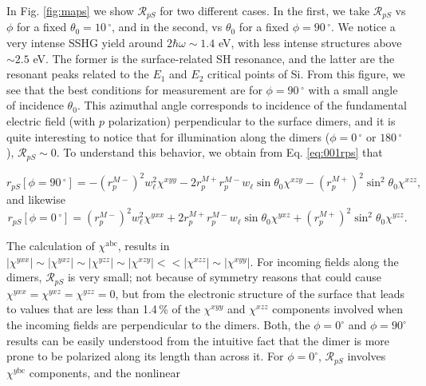 \documentclass[aps,prb,10pt,showpacs,letterpaper,twocolumn]{revtex4-1}
\begin{document}
In Fig. \ref{fig:maps} we show $\mathcal{R}_{pS}$ for two different cases. In
the first, we take $\mathcal{R}_{pS}$ vs $\phi$ for a fixed $\theta_{0} =
10\,^{\circ}$, and in the second, vs $\theta_{0}$ for a fixed $\phi =
90\,^{\circ}$. We notice a very intense SSHG yield around $2\hbar\omega\sim 1.4$
eV, with less intense structures above $\sim 2.5$ eV. The former is the
surface-related SH resonance, and the latter are the resonant peaks related to
the $E_{1}$ and $E_{2}$ critical points of Si. From this figure, we see that the
best conditions for measurement are for $\phi = 90\,^{\circ}$ with a small angle
of incidence $\theta_{0}$. This azimuthal angle corresponds to incidence of the
fundamental electric field (with $p$ polarization) perpendicular to the surface
dimers, and it is quite interesting to notice that for illumination along the
dimers ($\phi = 0\,^{\circ}$ or $180\,^{\circ}$), $\mathcal{R}_{pS}\sim 0$. To
understand this behavior, we obtain from Eq. \eqref{eq:001rps} that
\begin{widetext}
\begin{equation}\label{eq:001rps90}
r_{pS}[\phi=90\,^{\circ}] =
- \left(r^{M-}_{p}\right)^{2}w^{2}_{\ell}\chi^{xyy}
- 2r^{M+}_{p}r^{M-}_{p}w_{\ell}\sin\theta_{0}\chi^{xzy}
- \left(r^{M+}_{p}\right)^{2}\sin^{2}\theta_{0}\chi^{xzz},
\end{equation}
and likewise
\begin{equation}\label{eq:001rps0}
r_{pS}[\phi=0\,^{\circ}] =
\left(r^{M-}_{p}\right)^{2}w^{2}_{\ell}\chi^{yxx}
+ 2r^{M+}_{p}r^{M-}_{p}w_{\ell}\sin\theta_{0}\chi^{yxz}
+ \left(r^{M+}_{p}\right)^{2}\sin^{2}\theta_{0}\chi^{yzz}.  
\end{equation}
\end{widetext}
The calculation of $\chi^{\mathrm{abc}}$,\cite{andersonPRB15} results in
$|\chi^{yxx}|\sim |\chi^{yxz}|\sim |\chi^{yzz}|\sim |\chi^{xzy}|<<
|\chi^{xzz}|\sim |\chi^{xyy}|$. For incoming fields along the dimers,
$\mathcal{R}_{pS}$ is very small; not because of symmetry reasons that could
cause $\chi^{yxx} = \chi^{yxz} = \chi^{yzz} = 0$, but from the electronic
structure of the surface that leads to values that are less than 1.4\,\% of the
$\chi^{xyy}$ and $\chi^{xzz}$ components involved when the incoming fields are
perpendicular to the dimers. Both, the $\phi=0^\circ$ and $\phi=90^\circ$
results can be  easily understood from the intuitive fact that the dimer is more
prone to be polarized along its length than across it.  For $\phi=0^\circ$,
$\mathcal{R}_{pS}$ involves $\chi^{y\mathrm{bc}}$ components, and the nonlinear
\end{document}
